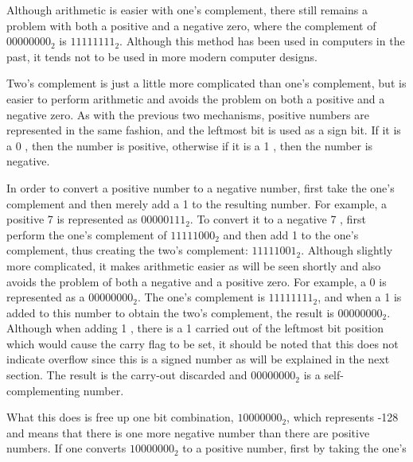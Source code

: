 \documentclass[10pt]{book}
\begin{document}
Although arithmetic is easier with one's complement, there still remains a problem with both a positive and a negative zero, where the complement of $00000000_{2}$ is $11111111_{2}$. Although this method has been used in computers in the past, it tends not to be used in more modern computer designs.

Two's complement is just a little more complicated than one's complement, but is easier to perform arithmetic and avoids the problem on both a positive and a negative zero. As with the previous two mechanisms, positive numbers are represented in the same fashion, and the leftmost bit is used as a sign bit. If it is a 0 , then the number is positive, otherwise if it is a 1 , then the number is negative.

In order to convert a positive number to a negative number, first take the one's complement and then merely add a 1 to the resulting number. For example, a positive 7 is represented as $00000111_{2}$. To convert it to a negative 7 , first perform the one's complement of $11111000_{2}$ and then add 1 to the one's complement, thus creating the two's complement: $11111001_{2}$. Although slightly more complicated, it makes arithmetic easier as will be seen shortly and also avoids the problem of both a negative and a positive zero. For example, a 0 is represented as a $00000000_{2}$. The one's complement is $11111111_{2}$, and when a 1 is added to this number to obtain the two's complement, the result is $00000000_{2}$. Although when adding 1 , there is a 1 carried out of the leftmost bit position which would cause the carry flag to be set, it should be noted that this does not indicate overflow since this is a signed number as will be explained in the next section. The result is the carry-out discarded and $00000000_{2}$ is a self-complementing number.

What this does is free up one bit combination, $10000000_{2}$, which represents -128 and means that there is one more negative number than there are positive numbers. If one converts $10000000_{2}$ to a positive number, first by taking the one's
\end{document}
